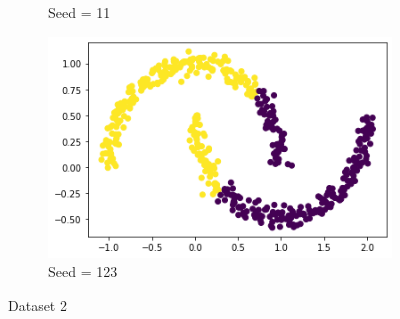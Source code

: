 \documentclass[12pt, fleqn]{article}
\begin{document}
\begin{figure}[H]
\begin{subfigure}[H]{0.35\textwidth}
        \caption[]{Seed = 11}
    \end{subfigure}
    \begin{subfigure}[H]{0.35\textwidth}
        \centering
        \includegraphics[width=\textwidth]{plots/D2/123.png}
        \caption[]{Seed = 123}
    \end{subfigure}
    \caption[]{Dataset 2}
\end{figure}
\end{document}
